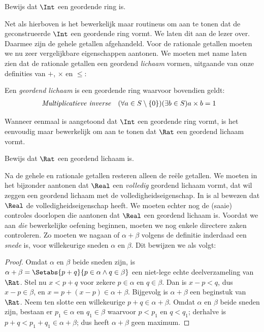 \documentclass[openany]{memoir}
\begin{document}
\begin{prob}
Bewijs dat $\Int$ een geordende ring is. 
\end{prob}
Net als hierboven is het bewerkelijk maar routineus om aan te tonen
dat de geconstrueerde $\Int$ een geordende ring vormt. We laten dit
aan de lezer over.
Daarmee zijn de gehele getallen afgehandeld. Voor de rationale
getallen moeten we nu zeer vergelijkbare eigenschappen aantonen. We
moeten met name laten zien dat de rationale getallen een geordend
\emph{lichaam} vormen, uitgaande van onze definities van $+$,
$\times$ en $\leq$:
\begin{defn}
Een \emph{geordend lichaam} is een geordende ring waarvoor bovendien geldt:
\begin{align*}
	\emph{Multiplicatieve inverse}& & (\forall a \in S \setminus \{0\})(\exists b \in S) a\times b& = 1
\end{align*}
\end{defn}
Wanneer eenmaal is aangetoond dat $\Int$ een geordende ring vormt, is
het eenvoudig maar bewerkelijk om aan te tonen dat $\Rat$ een
geordend lichaam vormt.
\begin{prob}
Bewijs dat $\Rat$ een geordend lichaam is.
\end{prob}
Na de gehele en rationale getallen resteren alleen de reële getallen.
We moeten in het bijzonder aantonen dat $\Real$ een \emph{volledig}
geordend lichaam vormt, dat wil zeggen een geordend lichaam met de
volledigheidseigenschap. In  is al
bewezen dat $\Real$ de volledigheidseigenschap heeft. We moeten echter
nog de (saaie) controles doorlopen die aantonen dat $\Real$ een
geordend lichaam is.
Voordat we aan \emph{die} bewerkelijke oefening beginnen, moeten we
nog enkele directere zaken controleren. Zo moeten we nagaan of
$\alpha + \beta$ volgens de definitie inderdaad een \emph{snede}
is, voor willekeurige sneden $\alpha$ en $\beta$. Dit bewijzen we als
volgt:
\begin{proof}	
Omdat $\alpha$ en $\beta$ beide sneden zijn, is $\alpha + \beta = \Setabs{p
+ q}{p \in \alpha \land q \in \beta}$ een niet-lege echte deelverzameling van
$\Rat$. Stel nu $x < p + q$ voor zekere $p \in \alpha$ en $q \in \beta$.
Dan is $x - p < q$, dus $x - p \in \beta$, en $x = p + (x - p) \in
\alpha + \beta$. Bijgevolg is $\alpha + \beta$ een beginstuk van $\Rat$.
Neem ten slotte een willekeurige $p + q \in \alpha + \beta$. Omdat
$\alpha$ en $\beta$ beide sneden zijn, bestaan er $p_1 \in \alpha$ en $q_1 \in \beta$
waarvoor $p < p_1$ en $q < q_1$; derhalve is $p + q < p_1 + q_1 \in \alpha +
\beta$; dus heeft $\alpha + \beta$ geen maximum.
\end{proof}
\end{document}
